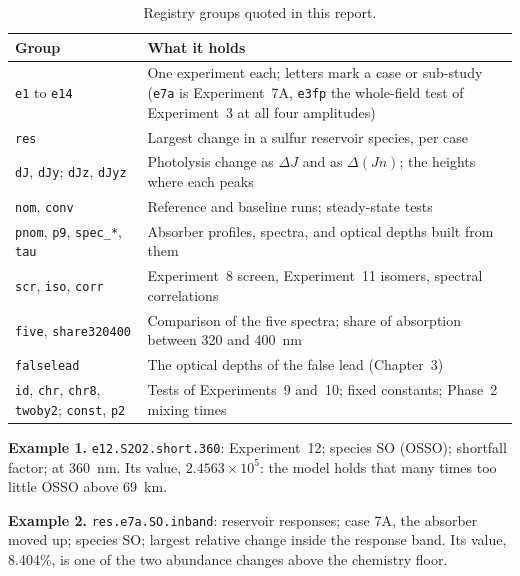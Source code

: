 \begin{table}[htbp]
  \centering
  \caption[Registry groups quoted in this report]{Registry groups quoted in this report.}
  \label{tab:keygroups}
  \footnotesize
  \begin{tabularx}{\textwidth}{>{\raggedright\arraybackslash}p{3.3cm}
                                >{\raggedright\arraybackslash}X}
    \toprule
    Group & What it holds \\
    \midrule
    \texttt{e1} to \texttt{e14} & One experiment each; letters mark a case or sub-study
      (\texttt{e7a} is Experiment~7A, \texttt{e3fp} the whole-field test of Experiment~3 at all four amplitudes) \\
    \texttt{res} & Largest change in a sulfur reservoir species, per case \\
    \texttt{dJ}, \texttt{dJy}; \texttt{dJz}, \texttt{dJyz} & Photolysis change as
      $\Delta J$ and as $\Delta(Jn)$; the heights where each peaks \\
    \texttt{nom}, \texttt{conv} & Reference and baseline runs; steady-state tests \\
    \texttt{pnom}, \texttt{p9}, \texttt{spec\_*}, \texttt{tau} & Absorber profiles,
      spectra, and optical depths built from them \\
    \texttt{scr}, \texttt{iso}, \texttt{corr} & Experiment~8 screen, Experiment~11
      isomers, spectral correlations \\
    \texttt{five}, \texttt{share320400} & Comparison of the five spectra; share of
      absorption between 320 and 400~nm \\
    \texttt{falselead} & The optical depths of the false lead (Chapter~3) \\
    \texttt{id}, \texttt{chr}, \texttt{chr8}, \texttt{twoby2}; \texttt{const},
      \texttt{p2} & Tests of
      Experiments~9 and~10; fixed constants; Phase~2 mixing times \\
    \bottomrule
  \end{tabularx}
\end{table}

\textbf{Example 1.} \texttt{e12.S2O2.short.360}: Experiment~12; species SO
(OSSO); shortfall factor; at 360~nm. Its value, $2.4563\times10^{5}$: the model holds that many
times too little OSSO above 69~km.

\textbf{Example 2.} \texttt{res.e7a.SO.inband}: reservoir responses; case 7A, the absorber
moved up; species SO; largest relative change inside the response band. Its value,
8.404\%, is one of the two abundance changes above the chemistry floor.

